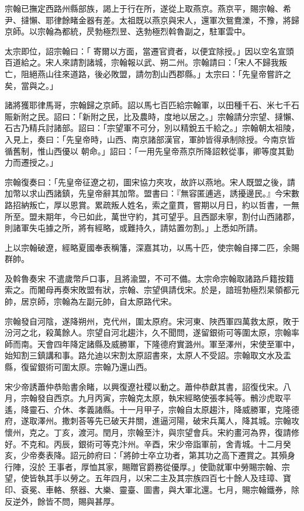 \begin{pinyinscope}
 宗翰已撫定西路州縣部族，謁上于行在所，遂從上取燕京。燕京平，賜宗翰、希尹、撻懶、耶律餘睹金器有差。太祖既以燕京與宋人，還軍次鴛鴦濼，不豫，將歸京師。以宗翰為都統，昃勃極烈昱、迭勃極烈斡魯副之，駐軍雲中。



 太宗即位，詔宗翰曰：「
 寄爾以方面，當遷官資者，以便宜除授。」因以空名宣頭百道給之。宋人來請割諸城，宗翰報以武、朔二州。宗翰請曰：「宋人不歸我叛亡，阻絕燕山往來道路，後必敗盟，請勿割山西郡縣。」太宗曰：「先皇帝嘗許之矣，當與之。」



 諸將獲耶律馬哥，宗翰歸之京師。詔以馬七百匹給宗翰軍，以田種千石、米七千石賑新附之民。詔曰：「新附之民，比及農時，度地以居之。」宗翰請分宗望、撻懶、石古乃精兵討諸部。詔曰：「宗望軍不可分，別以精銳五千給之。」宗翰朝太祖陵，入見上，奏曰：「先皇帝時，山西、南京諸部漢官，軍帥皆得承制除授。今南京皆循舊制，惟山西優以
 朝命。」詔曰：「一用先皇帝燕京所降詔敕從事，卿等度其勤力而遷授之。」



 宗翰復奏曰：「先皇帝征遼之初，圖宋協力夾攻，故許以燕地。宋人既盟之後，請加幣以求山西諸鎮，先皇帝辭其加幣。盟書曰：『無容匿逋逃，誘擾邊民。』今宋數路招納叛亡，厚以恩賞。累疏叛人姓名，索之童貫，嘗期以月日，約以哲書，一無所至。盟未期年，今已如此，萬世守約，其可望乎。且西鄙未寧，割付山西諸郡，則諸軍失屯據之所，將有經略，或難持久，請姑置勿割。」上悉如所請。



 上以宗翰破遼，經略夏國奉表稱籓，深嘉其功，以馬十匹，使宗翰自擇二匹，余賜群帥。



 及斡魯奏宋
 不遣歲幣戶口事，且將渝盟，不可不備。太宗命宗翰取諸路戶籍按籍索之。而闍母再奏宋敗盟有狀，宗翰、宗望俱請伐宋。於是，諳班勃極烈杲領都元帥，居京師，宗翰為左副元帥，自太原路代宋。



 宗翰發自河陰，遂降朔州，克代州，圍太原府。宋河東、陜西軍四萬救太原，敗于汾河之北，殺萬餘人。宗望自河北趨汴，久不聞問，遂留銀術可等圍太原，宗翰率師而南。天會四年降定諸縣及威勝軍，下隆德府實潞州。軍至澤州，宋使至軍中，始知割三鎮講和事。路允迪以宋割太原詔書來，太原人不受詔。宗翰取文水及盂縣，復留銀術可圍太原。宗翰乃還山西。



 宋少帝誘蕭仲恭貽書余睹，以興復遼社稷以動之。蕭仲恭獻其書，詔復伐宋。八月，宗翰發自西京。九月丙寅，宗翰克太原，執宋經略使張孝純等。鶻沙虎取平遙，降靈石、介休、孝義諸縣。十一月甲子，宗翰自太原趨汴，降威勝軍，克隆德府，遂取澤州。撒刺荅等先已破天井關，進逼河陽，破宋兵萬人，降其城。宗翰攻懷州，克之。丁亥，渡河。閏月，宗翰至汴，與宗望會兵。宋約畫河為界，復請修好。不克和。丙辰，銀術可等克汴州。辛酉，宋少帝詣軍前，舍青城。十二月癸亥，少帝奏表降。詔元帥府曰：「將帥士卒立功者，第其功之高下遷賞之。其殞身行陣，沒於
 王事者，厚恤其家，賜贈官爵務從優厚。」使勖就軍中勞賜宗翰、宗望，使皆執其手以勞之。五年四月，以宋二主及其宗族四百七十餘人及珪璋、寶印、袞冕、車輅、祭器、大樂、靈臺、圖書，與大軍北還。七月，賜宗翰鐵券，除反逆外，餘皆不問，賜與甚厚。




\end{pinyinscope}
